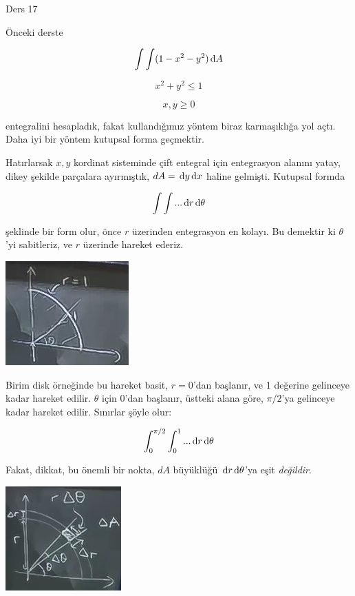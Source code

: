\documentclass[12pt,fleqn]{article}\usepackage{../../common}
\begin{document}
Ders 17

Önceki derste 

$$ \int \int (1-x^2-y^2) \,\mathrm{d} A $$

$$ x^2+y^2 \le 1 $$

$$ x,y \ge 0 $$

entegralini hesapladık, fakat kullandığımız yöntem biraz karmaşıklığa yol
açtı. Daha iyi bir yöntem kutupsal forma geçmektir. 

Hatırlarsak $x,y$ kordinat sisteminde çift entegral için entegrasyon alanını
yatay, dikey şekilde parçalara ayırmıştık, $dA = \,\mathrm{d} y \,\mathrm{d} x$ haline
gelmişti. Kutupsal formda

$$ \int \int  ... \,\mathrm{d} r \,\mathrm{d} \theta$$

şeklinde bir form olur, önce $r$ üzerinden entegrasyon en kolayı. Bu
demektir ki $\theta$'yi sabitleriz, ve $r$ üzerinde hareket ederiz. 

\begin{center}
\includegraphics[height=4cm]{17_1.png}
\end{center}

Birim disk örneğinde bu hareket basit, $r=0$'dan başlanır, ve 1 değerine
gelinceye kadar hareket edilir. $\theta$ için 0'dan başlanır, üstteki alana
göre, $\pi/2$'ya gelinceye kadar hareket edilir. Sınırlar şöyle olur:

$$ \int_0^{\pi/2} \int_0^1  ... \,\mathrm{d} r \,\mathrm{d} \theta$$

Fakat, dikkat, bu önemli bir nokta, $dA$ büyüklüğü $\,\mathrm{d} r \,\mathrm{d} \theta$'ya eşit
{\em değildir}.

\begin{center}
\includegraphics[height=4cm]{17_2.png}
\end{center}
\end{document}
